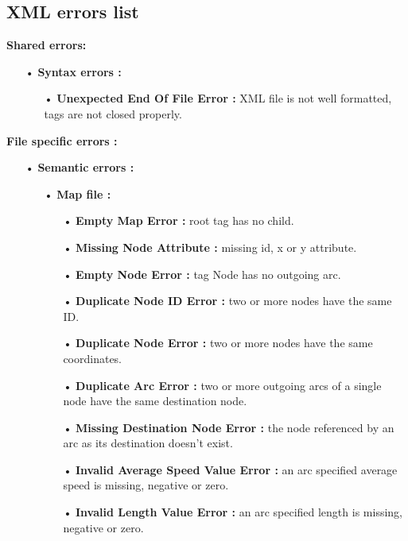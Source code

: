 \documentclass[paper=a4, fontsize=11pt]{report}
\numberwithin{equation}{section}		%
\numberwithin{figure}{section}		%
\numberwithin{table}{section}		%
\begin{document}
\subsection{XML errors list}
\label{subsec:xml-errors-lists}

\textbf{Shared errors:}
\begin{itemize}
  \item[•] \textbf{Syntax errors :}
  \begin{itemize}
    \item[•] \textbf{Unexpected End Of File Error :} XML file is not well formatted, tags are not closed properly.
  \end{itemize}
\end{itemize}

\textbf{File specific errors :}
\begin{itemize}
  \item[•] \textbf{Semantic errors :}
  \begin{itemize}
    \item[•] \textbf{Map file :}
    \begin{itemize}
      \item[•] \textbf{Empty Map Error :} root tag has no child.
      \item[•] \textbf{Missing Node Attribute :} missing id, x or y attribute.
      \item[•] \textbf{Empty Node Error :} tag Node has no outgoing arc.
      \item[•] \textbf{Duplicate Node ID Error :} two or more nodes have the same ID.
      \item[•] \textbf{Duplicate Node Error :} two or more nodes have the same coordinates.
      \item[•] \textbf{Duplicate Arc Error :} two or more outgoing arcs of a single node have the same destination node. 
      \item[•] \textbf{Missing Destination Node Error :} the node referenced by an arc as its destination doesn’t exist. 
      \item[•] \textbf{Invalid Average Speed Value Error :} an arc specified average speed is missing, negative or zero. 
      \item[•] \textbf{Invalid Length Value Error :} an arc specified length is missing, negative or zero.
    \end{itemize}


\end{itemize}
\end{itemize}
\end{document}
